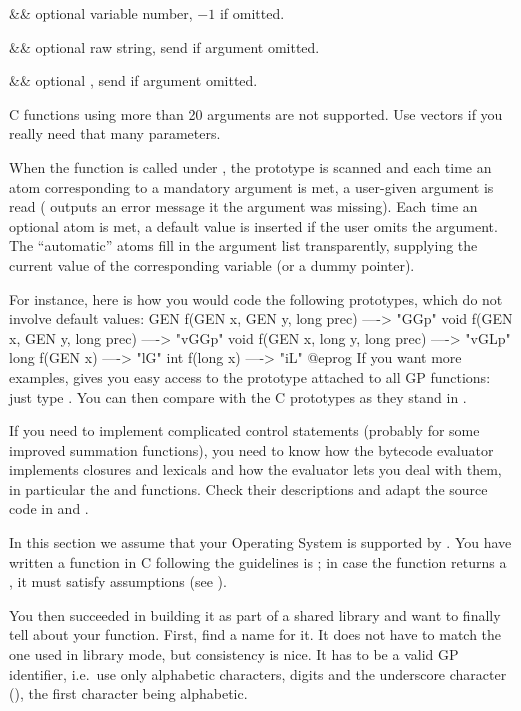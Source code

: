 \+&& optional variable number, $-1$ if omitted.\cr

\+&& optional raw string, send  if argument omitted.\cr

\+&& optional , send  if argument omitted.\cr

 C functions using more than 20 arguments are not
supported. Use vectors if you really need that many parameters.

When the function is called under , the prototype is scanned and each
time an atom corresponding to a mandatory argument is met, a user-given
argument is read ( outputs an error message it the argument was
missing). Each time an optional atom is met, a default value is inserted if the
user omits the argument. The ``automatic'' atoms fill in the argument list
transparently, supplying the current value of the corresponding variable (or a
dummy pointer).

For instance, here is how you would code the following prototypes, which
do not involve default values:
\bprog
GEN f(GEN x, GEN y, long prec)   ----> "GGp"
void f(GEN x, GEN y, long prec)  ----> "vGGp"
void f(GEN x, long y, long prec) ----> "vGLp"
long f(GEN x)                    ----> "lG"
int f(long x)                    ----> "iL"
@eprog\noindent
If you want more examples,  gives you easy access to the prototype
attached to all GP functions: just type . You
can then compare with the C prototypes as they stand in .

 If you need to implement complicated control statements
(probably for some improved summation functions), you need to know
how the bytecode evaluator implements closures and lexicals and how the evaluator lets
you deal with them, in particular the  and 
functions. Check their descriptions and adapt the source code in
 and .


In this section we assume that your Operating System is supported by
. You have written a function in C following the guidelines is
; in case the function returns a , it
must satisfy  assumptions (see ).

You then succeeded in building it as part of a shared library and want to
finally tell  about your function. First, find a name for it. It does
not have to match the one used in library mode, but consistency is nice. It
has to be a valid GP identifier, i.e.~use only alphabetic characters, digits
and the underscore character (\kbd{\_}), the first character being
alphabetic.

